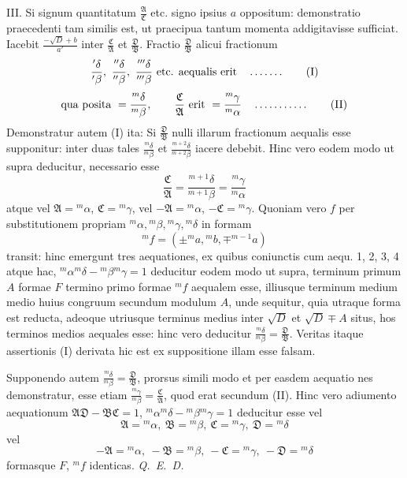 III. Si signum quantitatum $\frac{\mathfrak{A}}{\mathfrak{C}}$ etc. signo ipsius $a$ oppositum: demonstratio praecedenti tam similis est, ut praecipua tantum momenta addigitavisse sufficiat. Iacebit $\frac{-\surd D+b}{a'}$ inter $\frac{\mathfrak{C}}{\mathfrak{A}}$ et $\frac{\mathfrak{D}}{\mathfrak{B}}$. Fractio $\frac{\mathfrak{D}}{\mathfrak{B}}$ alicui fractionum
\begin{equation*}
\frac{{}'\delta}{{}'\beta},\ \frac{{}''\delta}{{}''\beta},\ \frac{{}'''\delta}{{}'''\beta}\text{ etc. aequalis erit}
\quad \mathinner{\ldotp\ldotp\ldotp\ldotp\ldotp\ldotp\ldotp} \tag*{(I)}
\end{equation*}
\begin{equation*}
\text{qua posita }=\frac{{}^m\delta}{{}^m\beta},\qquad \frac{\mathfrak{C}}{\mathfrak{A}}\text{ erit }=\frac{{}^m\gamma}{{}^m\alpha}
\quad \mathinner{\ldotp\ldotp\ldotp\ldotp\ldotp\ldotp\ldotp\ldotp\ldotp\ldotp\ldotp} \tag*{(II)}
\end{equation*}
Demonstratur autem (I) ita: Si $\frac{\mathfrak{D}}{\mathfrak{B}}$ nulli illarum fractionum aequalis esse supponitur: inter duas tales $\frac{{}^m\delta}{{}^m\beta}$ et $\frac{{}^{m+2}\delta}{{}^{m+2}\beta}$ iacere debebit. Hinc vero eodem modo ut supra deducitur, necessario esse
\[
\frac{\mathfrak{C}}{\mathfrak{A}}=\frac{{}^{m+1}\delta}{{}^{m+1}\beta}=\frac{{}^m\gamma}{{}^m\alpha}
\]
atque vel $\mathfrak{A}={}^m\alpha$, $\mathfrak{C}={}^m\gamma$, vel $-\mathfrak{A}={}^m\alpha$, $-\mathfrak{C}={}^m\gamma$. Quoniam vero $f$ per substitutionem propriam ${}^m\alpha,{}^m\beta,{}^m\gamma,{}^m\delta$ in formam
\[
{}^m f=(\pm{}^m a,{}^m b,\mp{}^{m-1}a)
\]
transit: hinc emergunt tres aequationes, ex quibus coniunctis cum aequ. 1, 2, 3, 4 atque hac, ${}^m\alpha{}^m\delta-{}^m\beta{}^m\gamma=1$ deducitur eodem modo ut supra, terminum primum $A$ formae $F$ termino primo formae ${}^m f$ aequalem esse, illiusque terminum medium medio huius congruum secundum modulum $A$, unde sequitur, quia utraque forma est reducta, adeoque utriusque terminus medius inter $\surd D$ et $\surd D\mp A$ situs, hos terminos medios aequales esse: hinc vero deducitur $\frac{{}^m\delta}{{}^m\beta}=\frac{\mathfrak{D}}{\mathfrak{B}}$. Veritas itaque assertionis (I) derivata hic est ex suppositione illam esse falsam.

Supponendo autem $\frac{{}^m\delta}{{}^m\beta}=\frac{\mathfrak{D}}{\mathfrak{B}}$, prorsus simili modo et per easdem aequatio%
%
nes demonstratur, esse etiam ${\frac{{}^m\gamma}{{}^m\beta}}=\frac{\mathfrak{C}}{\mathfrak{A}}$, quod erat secundum (II). Hinc vero adiumento aequationum $\mathfrak{A}\mathfrak{D}-\mathfrak{B}\mathfrak{C}=1$, ${}^m\alpha{}^m\delta-{}^m\beta{}^m\gamma=1$ deducitur esse vel
\[
\mathfrak{A}={}^m\alpha,\ \mathfrak{B}={}^m\beta,\ \mathfrak{C}={}^m\gamma,\ \mathfrak{D}={}^m\delta
\]
vel
\[
-\mathfrak{A}={}^m\alpha,\ -\mathfrak{B}={}^m\beta,\ -\mathfrak{C}={}^m\gamma,\ -\mathfrak{D}={}^m\delta
\]
formasque $F$, ${}^m f$ identicas. \textit{Q. E. D.}

